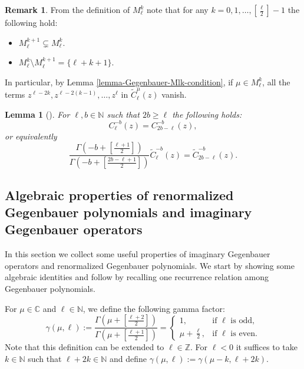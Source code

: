 \documentclass[12pt, pdflatex, a4paper]{article}
\theoremstyle{plain}
\newtheorem{lemma}[thm]{Lemma}
\theoremstyle{definition}
\newtheorem{rem}[thm]{Remark}
\def\C{{\mathbb C}}
\def\Geg{\widetilde{C}}
\def\N{{\mathbb N}}
\def\Z{{\mathbb Z}}
\begin{document}
\begin{rem}\label{rem-Mlk}
From the definition of $M_\ell^k$ note that for any $k = 0, 1, \ldots, \left[\frac{\ell}{2}\right]-1$ the following hold:
\begin{itemize}
\item[(1)] $M_\ell^{k+1} \subsetneq M_\ell^{k}$. 
\item[(2)] $M_\ell^k \setminus M_\ell^{k+1} = \{\ell + k + 1\}$.
\end{itemize}
In particular, by Lemma \ref{lemma-Gegenbauer-Mlk-condition}, if $\mu \in M_\ell^k$, all the terms $z^{\ell-2k}, z^{\ell-2(k-1)}, \ldots, z^{\ell}$ in $\Geg_\ell^\mu(z)$ vanish. 
\end{rem}

\begin{lemma}[{\cite[Lem. 4.12]{KOSS15}}]\label{lemma-KOSS} For $\ell,b \in \N$ such that $2b \geq \ell$ the following holds:
\begin{equation*}
C_\ell^{-b}(z) = C_{2b-\ell}^{-b}(z),
\end{equation*}
or equivalently
\begin{equation}\label{identity-KOSS}
\frac{\Gamma\left(-b + \left[\frac{\ell+1}{2}\right]\right)}{\Gamma\left(-b + \left[\frac{2b-\ell+1}{2}\right]\right)}\Geg_{\ell}^{-b}(z) = \Geg_{2b-\ell}^{-b}(z).
\end{equation}
\end{lemma}

\subsection{Algebraic properties of renormalized Gegenbauer polynomials and imaginary Gegenbauer operators}
In this section we collect some useful properties of imaginary Gegenbauer operators and renormalized Gegenbauer polynomials. We start by showing some algebraic identities and follow by recalling one recurrence relation among Gegenbauer polynomials.

For $\mu \in \C$ and $\ell \in \N$, we define the following gamma factor:
\begin{equation}\label{gamma-def}
\gamma(\mu, \ell) := \displaystyle{\frac{\Gamma(\mu + \left[\frac{\ell+2}{2}\right])}{\Gamma(\mu + \left[\frac{\ell + 1}{2}\right])} = \begin{cases}
1,&\text{if } \ell \text{ is odd},\\
\mu + \frac{\ell}{2},&\text{if } \ell \text{ is even}.
\end{cases}}
\end{equation}
Note that this definition can be extended to $\ell \in \Z$. For $\ell < 0$ it suffices to take $k \in \N$ such that $\ell + 2k \in \N$ and define $\gamma(\mu, \ell) := \gamma(\mu-k,\ell + 2k)$. 
\end{document}
